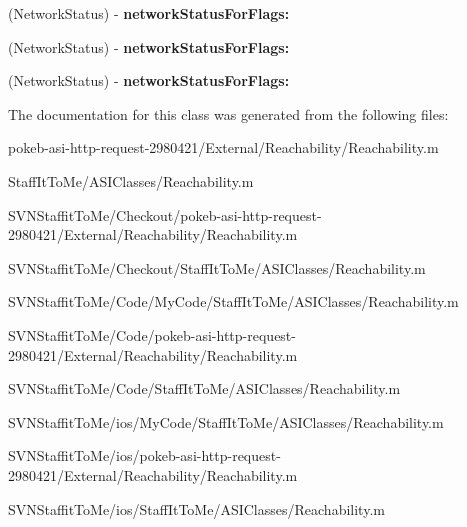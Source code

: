 \begin{DoxyCompactItemize}
\item 
\hypertarget{interface_reachability_07private_08_ad50f17c5ae87abdd51ab30417466ae20}{
(\-Network\-Status) -\/ {\bfseries network\-Status\-For\-Flags\-:}}
\label{interface_reachability_07private_08_ad50f17c5ae87abdd51ab30417466ae20}

\item 
\hypertarget{interface_reachability_07private_08_ad50f17c5ae87abdd51ab30417466ae20}{
(\-Network\-Status) -\/ {\bfseries network\-Status\-For\-Flags\-:}}
\label{interface_reachability_07private_08_ad50f17c5ae87abdd51ab30417466ae20}

\item 
\hypertarget{interface_reachability_07private_08_ad50f17c5ae87abdd51ab30417466ae20}{
(\-Network\-Status) -\/ {\bfseries network\-Status\-For\-Flags\-:}}
\label{interface_reachability_07private_08_ad50f17c5ae87abdd51ab30417466ae20}

\end{DoxyCompactItemize}


\-The documentation for this class was generated from the following files\-:\begin{DoxyCompactItemize}
\item 
pokeb-\/asi-\/http-\/request-\/2980421/\-External/\-Reachability/\-Reachability.\-m\item 
\-Staff\-It\-To\-Me/\-A\-S\-I\-Classes/\-Reachability.\-m\item 
\-S\-V\-N\-Staffit\-To\-Me/\-Checkout/pokeb-\/asi-\/http-\/request-\/2980421/\-External/\-Reachability/\-Reachability.\-m\item 
\-S\-V\-N\-Staffit\-To\-Me/\-Checkout/\-Staff\-It\-To\-Me/\-A\-S\-I\-Classes/\-Reachability.\-m\item 
\-S\-V\-N\-Staffit\-To\-Me/\-Code/\-My\-Code/\-Staff\-It\-To\-Me/\-A\-S\-I\-Classes/\-Reachability.\-m\item 
\-S\-V\-N\-Staffit\-To\-Me/\-Code/pokeb-\/asi-\/http-\/request-\/2980421/\-External/\-Reachability/\-Reachability.\-m\item 
\-S\-V\-N\-Staffit\-To\-Me/\-Code/\-Staff\-It\-To\-Me/\-A\-S\-I\-Classes/\-Reachability.\-m\item 
\-S\-V\-N\-Staffit\-To\-Me/ios/\-My\-Code/\-Staff\-It\-To\-Me/\-A\-S\-I\-Classes/\-Reachability.\-m\item 
\-S\-V\-N\-Staffit\-To\-Me/ios/pokeb-\/asi-\/http-\/request-\/2980421/\-External/\-Reachability/\-Reachability.\-m\item 
\-S\-V\-N\-Staffit\-To\-Me/ios/\-Staff\-It\-To\-Me/\-A\-S\-I\-Classes/\-Reachability.\-m\end{DoxyCompactItemize}

